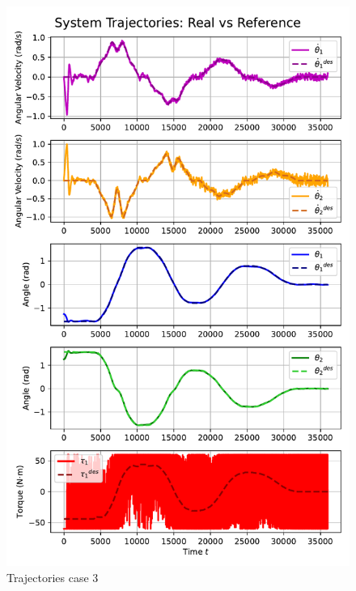 \begin{figure}[htb]
    \centering
    \includegraphics[width=1\linewidth]{img/4-task4/MPC3.pdf}
    \caption{Trajectories case 3}
    \label{fig:dtheta1-evolution}
\end{figure}

